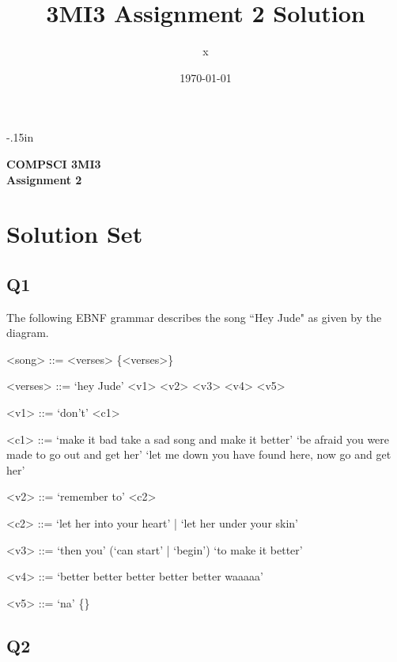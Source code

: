 \documentclass[12pt, fleqn]{article}
\begin{document}
\newcommand{\pnote}[1]{{\langle \text{#1} \rangle}}
\newcommand{\mname}[1]{\mbox{\sf #1}}


\setlength {\topmargin} {-.15in}
\oddsidemargin 0mm
\evensidemargin 0mm
\textwidth 160mm
\textheight 200mm

\pagestyle {plain}


\title{3MI3 Assignment 2 Solution}
\author{x}
\date{\today}

\begin{center}
    {\large \textbf{COMPSCI 3MI3}}\\[8mm]
    {\huge \textbf{Assignment 2}}\\[6mm]
\end{center}

\medskip

\section{Solution Set}

\subsection{Q1}
The following EBNF grammar describes the song ``Hey Jude" as given by the diagram.

\begin{grammar}
<song> ::= <verses> \{<verses>\}

<verses> ::= `hey Jude' <v1> <v2> <v3> <v4> <v5>

<v1> ::= `don't' <c1>

<c1> ::= `make it bad take a sad song and make it better' 
        \alt  `be afraid you were made to go out and get her'
        \alt `let me down you have found here, now go and get her'

<v2> ::= `remember to' <c2>

<c2> ::= `let her into your heart' | `let her under your skin'

<v3> ::= `then you' (`can start' | `begin') `to make it better'

<v4> ::= `better better better better better waaaaa'

<v5> ::= `na' \{<v5>\} 
\end{grammar}

\subsection{Q2}
\end{document}
